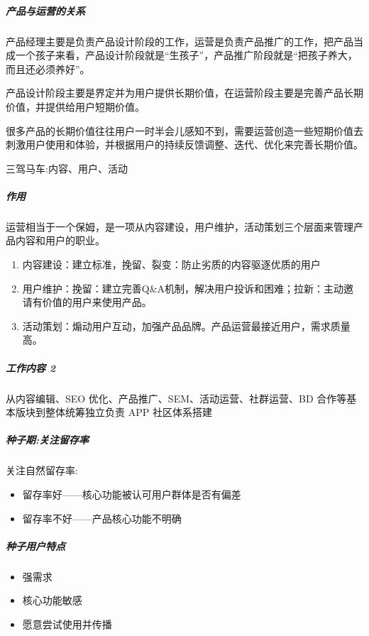 \documentclass[letterpaper,10pt,english]{sphinxmanual}
\begin{document}
\subparagraph{产品与运营的关系}
\label{\detokenize{chapter_idea/GTM:id5}}
产品经理主要是负责产品设计阶段的工作，运营是负责产品推广的工作，把产品当成一个孩子来看，产品设计阶段就是“生孩子”，产品推广阶段就是“把孩子养大，而且还必须养好”。

产品设计阶段主要是界定并为用户提供长期价值，在运营阶段主要是完善产品长期价值，并提供给用户短期价值。

很多产品的长期价值往往用户一时半会儿感知不到，需要运营创造一些短期价值去刺激用户使用和体验，并根据用户的持续反馈调整、迭代、优化来完善长期价值。

三驾马车:内容、用户、活动


\subparagraph{作用}
\label{\detokenize{chapter_idea/GTM:id6}}
运营相当于一个保姆，是一项从内容建设，用户维护，活动策划三个层面来管理产品内容和用户的职业。
\begin{enumerate}
%
\item {} 
内容建设：建立标准，挽留、裂变：防止劣质的内容驱逐优质的用户

\item {} 
用户维护：挽留：建立完善Q\&A机制，解决用户投诉和困难；拉新：主动邀请有价值的用户来使用产品。

\item {} 
活动策划：煽动用户互动，加强产品品牌。产品运营最接近用户，需求质量高。

\end{enumerate}


\subparagraph{工作内容 2\sphinxfootnotemark[467]}
\label{\detokenize{chapter_idea/GTM:id7}}%
\begin{footnotetext}[467]\sphinxAtStartFootnote
{}
%
\end{footnotetext}\ignorespaces 
从内容编辑、SEO 优化、产品推广、SEM、活动运营、社群运营、BD
合作等基本版块到整体统筹独立负责 APP 社区体系搭建


\subparagraph{种子期:关注留存率}
\label{\detokenize{chapter_idea/GTM:id8}}
关注自然留存率:
\begin{itemize}
\item {} 
留存率好——核心功能被认可用户群体是否有偏差

\item {} 
留存率不好——产品核心功能不明确

\end{itemize}


\subparagraph{种子用户特点}
\label{\detokenize{chapter_idea/GTM:id9}}\begin{itemize}
\item {} 
强需求

\item {} 
核心功能敏感

\item {} 
愿意尝试使用并传播

\end{itemize}
\end{document}
